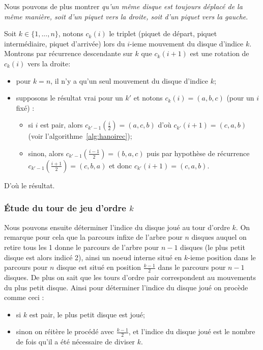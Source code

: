 \documentclass[a4paper,13pt]{article}
\begin{document}
Nous pouvons de plus montrer \emph{qu'un même disque est toujours déplacé de la même manière, soit d'un piquet vers la droite, soit d'un piquet vers la gauche}.\par
Soit $k \in \{ 1, ..., n\}$, notons $c_{k}(i)$ le triplet (piquet de départ, piquet intermédiaire, piquet d'arrivée) lors du $i$-ieme mouvement du disque d'indice $k$. Montrons par récurrence descendante sur $k$ que $c_{k}(i+1)$ est une rotation de $c_{k}(i)$ vers la droite:
\begin{itemize}
  \item pour $k=n$, il n'y a qu'un seul mouvement du disque d'indice $k$;
  \item supposons le résultat vrai pour un $k'$ et notons $c_{k}(i) = (a,b,c)$ (pour un $i$ fixé) :
    \begin{itemize}
      \item si $i$ est pair, alors $c_{k'-1}(\frac{i}{2}) = (a,c,b)$ d'où $c_{k'}(i+1) = (c,a,b)$ (voir l'algorithme~\ref{alg:hanoirec});
      \item sinon, alors $c_{k'-1}(\frac{i-1}{2}) = (b,a,c)$ puis par hypothèse de récurrence $c_{k'-1}(\frac{i+1}{2}) = (c,b,a)$ et donc $c_{k'}(i+1) = (c,a,b)$.
    \end{itemize}
\end{itemize}

D'où le résultat.

\subsubsection{Étude du tour de jeu d'ordre $k$}

Nous pouvons ensuite déterminer l'indice du disque joué au tour d'ordre $k$. On remarque pour cela que la parcours infixe de l'arbre pour $n$ disques auquel on retire tous les 1 donne le parcours de l'arbre pour $n-1$ disques (le plus petit disque est alors indicé 2), ainsi un noeud interne situé en $k$-ieme position dans le parcours pour $n$ disque est situé en position $\frac{k-1}{2}$ dans le parcours pour $n-1$ disques. De plus on sait que les tours d'ordre pair correspondent au mouvements du plus petit disque. Ainsi pour déterminer l'indice du disque joué on procède comme ceci :
\begin{itemize}
  \item si $k$ est pair, le plus petit disque est joué;
  \item sinon on réitère le procédé avec $\frac{k-1}{2}$, et l'indice du disque joué est le nombre de fois qu'il a été nécessaire de diviser $k$.
\end{itemize}
\end{document}
